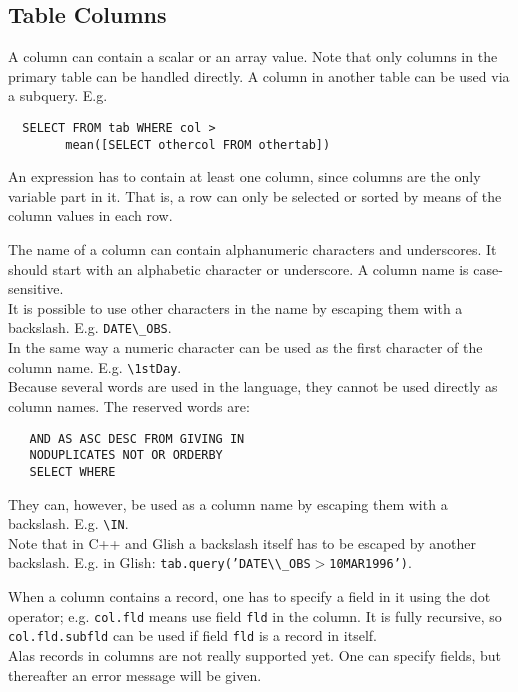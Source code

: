 \subsection{\label{TAQL:COLUMNS}Table Columns}
A column can contain a scalar or an array value.
Note that only columns in the primary table can be handled directly.
A column in another table can be used via a subquery. E.g.
\begin{verbatim}
  SELECT FROM tab WHERE col >
        mean([SELECT othercol FROM othertab])
\end{verbatim}
An expression has to contain at least one column, since columns
are the only variable part in it. That is, a row can only be selected
or sorted by means of the column values in each row.

The name of a column can contain alphanumeric characters and underscores.
It should start with an alphabetic character or underscore.
A column name is case-sensitive.
\\It is possible to use other characters in the name by
escaping them with a backslash. E.g. \texttt{DATE}\verb+\_+\texttt{OBS}.
\\In the same way a numeric character can be used as the first
character of the column name. E.g. \verb+\+\texttt{1stDay}.
\\
Because several words are used in the language, they cannot
be used directly as column names. The reserved words are:
\begin{verbatim}
   AND AS ASC DESC FROM GIVING IN
   NODUPLICATES NOT OR ORDERBY
   SELECT WHERE
\end{verbatim}
They can, however, be used as a column name by escaping
them with a backslash. E.g. \verb+\+\texttt{IN}.
\\Note that in C++ and Glish a backslash itself has to be escaped
by another backslash. E.g. in Glish:
\texttt{tab.query('DATE}\verb+\\_+\texttt{OBS$>$10MAR1996')}.

When a column contains a record, one has to specify a field in it
using the dot operator; e.g. \texttt{col.fld} means use field
\texttt{fld} in the column. It is fully recursive, so
\texttt{col.fld.subfld} can be used if field \texttt{fld} is a record
in itself.
\\Alas records in columns are not really supported yet. One can specify
fields, but thereafter an error message will be given.

